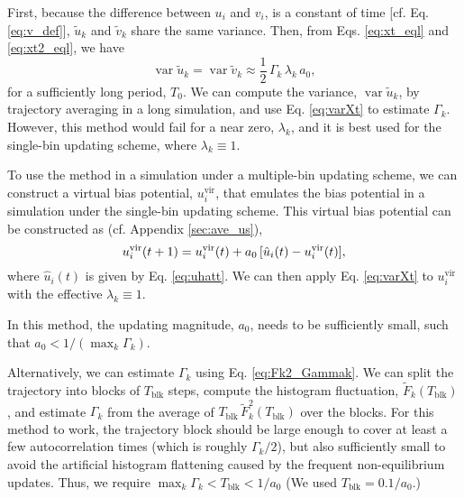 \documentclass[reprint, superscriptaddress, floatfix]{revtex4-1}
\begin{document}
First, because the difference between $u_i$ and $v_i$,
is a constant of time [cf. Eq. \eqref{eq:v_def}],
${\tilde u}_{k}$ and ${\tilde v}_{k}$
share the same variance.
%
%
Then, from Eqs. \eqref{eq:xt_eql} and \eqref{eq:xt2_eql}, we have
%
\begin{equation}
  \operatorname{var} {\tilde u}_k
  =
  \operatorname{var} {\tilde v}_{k}
  \approx
  \frac{1}{2} \, \Gamma_k \, \lambda_k \, a_0
  ,
\label{eq:varXt}
\end{equation}
%
for a sufficiently long period, $T_0$.
%
We can compute the variance, $\operatorname{var} \tilde u_k$,
by trajectory averaging in a long simulation,
and use Eq. \eqref{eq:varXt} to estimate $\Gamma_k$.
%
However, this method would fail for a near zero, $\lambda_k$,
and it is best used for the single-bin updating scheme,
where $\lambda_k \equiv 1$.

To use the method in a simulation under a multiple-bin updating scheme,
we can construct a virtual bias potential, $u_i^\mathrm{vir}$,
that emulates the bias potential in a simulation
under the single-bin updating scheme.
%
This virtual bias potential can be constructed as (cf. Appendix \ref{sec:ave_us}),
\begin{equation}
  u_i^\mathrm{vir}(t+1)
  =
  u_i^\mathrm{vir}(t)
  +
  a_0 \, [\hat u_i(t) - u_i^\mathrm{vir}(t)]
  ,
  \notag
\end{equation}
%
where $\hat u_i(t)$ is given by Eq. \eqref{eq:uhatt}.
%
We can then apply Eq. \eqref{eq:varXt} to $u_i^\mathrm{vir}$
with the effective $\lambda_k \equiv 1$.

In this method, the updating magnitude, $a_0$,
needs to be sufficiently small, such that
$a_0 < 1/\left(\max_k \Gamma_k \right)$.

Alternatively, we can estimate $\Gamma_k$ using Eq. \eqref{eq:Fk2_Gammak}.
%
We can split the trajectory into blocks of $T_\mathrm{blk}$ steps,
compute the histogram fluctuation, $\tilde F_k(T_\mathrm{blk})$,
and estimate $\Gamma_k$ from the average of
$T_\mathrm{blk} \, \tilde F_k^2(T_\mathrm{blk})$
over the blocks.
%
For this method to work,
the trajectory block should be large enough
to cover at least a few autocorrelation times (which is roughly $\Gamma_k/2$),
but also sufficiently small
to avoid the artificial histogram flattening
caused by the frequent non-equilibrium updates.
Thus, we require $\max_k \Gamma_k < T_\mathrm{blk} < 1/a_0$
(We used $T_\mathrm{blk} = 0.1/a_0$.)
\end{document}
